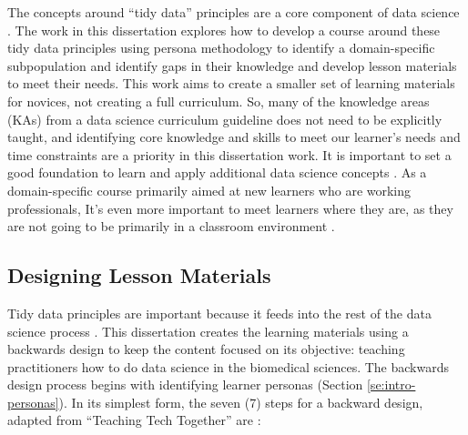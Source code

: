 \documentclass[010-intro.tex]{subfiles}
\begin{document}
    The concepts around ``tidy data'' principles are a core component of data science
    \cite{ccdsc2021, wickhamTidyData2014}.
    The work in this dissertation explores how to develop a course around these tidy data principles
    using persona methodology to identify a domain-specific subpopulation and identify gaps in their knowledge
    and develop lesson materials to meet their needs.
    This work aims to create a smaller set of learning materials for novices, not creating a full curriculum.
    So, many of the knowledge areas (KAs) from a data science curriculum guideline does not need to be explicitly taught,
    and identifying core knowledge and skills to meet our learner's needs and time constraints are a priority
    in this dissertation work.
    It is important to set a good foundation to learn and apply additional data science concepts
    \cite{cc2005, cc2020, gaise2016, ambrose2010learning, wilson2019teaching, hermansProgrammerBrain2021}.
    As a domain-specific course primarily aimed at new learners who are working professionals,
    It's even more important to meet learners where they are, as they are not going to be primarily in a classroom environment
    \cite{wilson2019teaching, Koch2016, thecarpentriesCarpentryTrainerTraining}.

    \subsection{Designing Lesson Materials}
    \label{sse:intro-lesson-design}

        Tidy data principles are important because it feeds into the rest of the data science process
        \cite{wickhamTidyData2014, ccdsc2021, wickhamR4ds}.
        This dissertation creates the learning materials using a backwards design to keep the content focused
        on its objective: teaching practitioners how to do data science in the biomedical sciences.
        The backwards design process begins with identifying learner personas (Section \ref{se:intro-personas}).
        In its simplest form, the seven (7) steps for a backward design, adapted from ``Teaching Tech Together'' are
        \cite{wilson2019teaching}:
\end{document}
